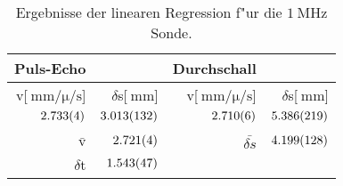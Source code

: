 \begin{table}[!h]
\begin{center}
\begin{tabular}{|r|r|r|r|}
\hline
Puls-Echo & & Durchschall & \\
\hline
\hline
v[$\SI{}{\milli\meter\per\micro\per\second}$] & $\delta$s[$\SI{}{\milli\meter}$] & v[$\SI{}{\milli\meter\per\micro\per\second}$]& $\delta$s[$\SI{}{\milli\meter}$]\\
\hline
$\SI{2.733 (4)}{}$ & $\SI{3.013 (132)}{}$ & $\SI{2.710 (6)}{}$ & $\SI{5.386 (219)}{}$\\
\hline
\hline
&&&\\
$\bar{\mathrm{v}}$ & $\SI{2.721 (4)}{}$ & $\bar{\delta s}$ & $\SI{4.199 (128)}{}$\\
\hline
$\delta$t & $\SI{1.543 (47)}{}$ & &\\
\hline
\end{tabular}
\caption[]{Ergebnisse der linearen Regression f"ur die $\SI{1}{\mega\hertz}$ Sonde.}
\label{r1}
\end{center}
\end{table}